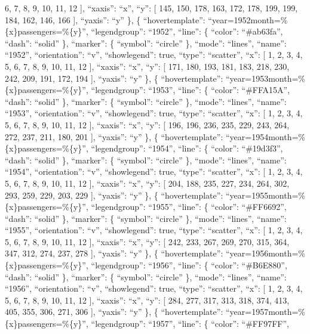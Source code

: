 \documentclass[
]{article}
\begin{document}
6, 7, 8, 9, 10, 11, 12 {]}, ``xaxis'': ``x'', ``y'': {[} 145, 150, 178,
163, 172, 178, 199, 199, 184, 162, 146, 166 {]}, ``yaxis'': ``y'' \}, \{
``hovertemplate'': ``year=1952month=\%\{x\}passengers=\%\{y\}'',
``legendgroup'': ``1952'', ``line'': \{ ``color'': ``\#ab63fa'',
``dash'': ``solid'' \}, ``marker'': \{ ``symbol'': ``circle'' \},
``mode'': ``lines'', ``name'': ``1952'', ``orientation'': ``v'',
``showlegend'': true, ``type'': ``scatter'', ``x'': {[} 1, 2, 3, 4, 5,
6, 7, 8, 9, 10, 11, 12 {]}, ``xaxis'': ``x'', ``y'': {[} 171, 180, 193,
181, 183, 218, 230, 242, 209, 191, 172, 194 {]}, ``yaxis'': ``y'' \}, \{
``hovertemplate'': ``year=1953month=\%\{x\}passengers=\%\{y\}'',
``legendgroup'': ``1953'', ``line'': \{ ``color'': ``\#FFA15A'',
``dash'': ``solid'' \}, ``marker'': \{ ``symbol'': ``circle'' \},
``mode'': ``lines'', ``name'': ``1953'', ``orientation'': ``v'',
``showlegend'': true, ``type'': ``scatter'', ``x'': {[} 1, 2, 3, 4, 5,
6, 7, 8, 9, 10, 11, 12 {]}, ``xaxis'': ``x'', ``y'': {[} 196, 196, 236,
235, 229, 243, 264, 272, 237, 211, 180, 201 {]}, ``yaxis'': ``y'' \}, \{
``hovertemplate'': ``year=1954month=\%\{x\}passengers=\%\{y\}'',
``legendgroup'': ``1954'', ``line'': \{ ``color'': ``\#19d3f3'',
``dash'': ``solid'' \}, ``marker'': \{ ``symbol'': ``circle'' \},
``mode'': ``lines'', ``name'': ``1954'', ``orientation'': ``v'',
``showlegend'': true, ``type'': ``scatter'', ``x'': {[} 1, 2, 3, 4, 5,
6, 7, 8, 9, 10, 11, 12 {]}, ``xaxis'': ``x'', ``y'': {[} 204, 188, 235,
227, 234, 264, 302, 293, 259, 229, 203, 229 {]}, ``yaxis'': ``y'' \}, \{
``hovertemplate'': ``year=1955month=\%\{x\}passengers=\%\{y\}'',
``legendgroup'': ``1955'', ``line'': \{ ``color'': ``\#FF6692'',
``dash'': ``solid'' \}, ``marker'': \{ ``symbol'': ``circle'' \},
``mode'': ``lines'', ``name'': ``1955'', ``orientation'': ``v'',
``showlegend'': true, ``type'': ``scatter'', ``x'': {[} 1, 2, 3, 4, 5,
6, 7, 8, 9, 10, 11, 12 {]}, ``xaxis'': ``x'', ``y'': {[} 242, 233, 267,
269, 270, 315, 364, 347, 312, 274, 237, 278 {]}, ``yaxis'': ``y'' \}, \{
``hovertemplate'': ``year=1956month=\%\{x\}passengers=\%\{y\}'',
``legendgroup'': ``1956'', ``line'': \{ ``color'': ``\#B6E880'',
``dash'': ``solid'' \}, ``marker'': \{ ``symbol'': ``circle'' \},
``mode'': ``lines'', ``name'': ``1956'', ``orientation'': ``v'',
``showlegend'': true, ``type'': ``scatter'', ``x'': {[} 1, 2, 3, 4, 5,
6, 7, 8, 9, 10, 11, 12 {]}, ``xaxis'': ``x'', ``y'': {[} 284, 277, 317,
313, 318, 374, 413, 405, 355, 306, 271, 306 {]}, ``yaxis'': ``y'' \}, \{
``hovertemplate'': ``year=1957month=\%\{x\}passengers=\%\{y\}'',
``legendgroup'': ``1957'', ``line'': \{ ``color'': ``\#FF97FF'',
\end{document}
